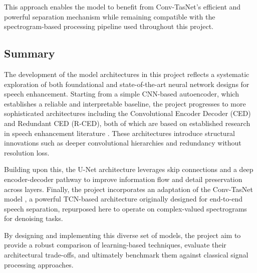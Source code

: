 This approach enables the model to benefit from Conv-TasNet’s efficient and powerful separation mechanism while remaining compatible with the spectrogram-based processing pipeline used throughout this project.


\subsection*{Summary}

The development of the model architectures in this project reflects a systematic exploration of both foundational and state-of-the-art neural network designs for speech enhancement. Starting from a simple CNN-based autoencoder, which establishes a reliable and interpretable baseline, the project progresses to more sophisticated architectures including the Convolutional Encoder Decoder (CED) and Redundant CED (R-CED), both of which are based on established research in speech enhancement literature \cite{park2017acoustic}. These architectures introduce structural innovations such as deeper convolutional hierarchies and redundancy without resolution loss.

Building upon this, the U-Net architecture leverages skip connections and a deep encoder-decoder pathway to improve information flow and detail preservation across layers. Finally, the project incorporates an adaptation of the Conv-TasNet model \cite{luo2019conv}, a powerful TCN-based architecture originally designed for end-to-end speech separation, repurposed here to operate on complex-valued spectrograms for denoising tasks.

By designing and implementing this diverse set of models, the project aim to provide a robust comparison of learning-based techniques, evaluate their architectural trade-offs, and ultimately benchmark them against classical signal processing approaches.




